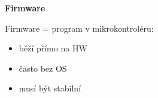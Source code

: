 \documentclass[a4paper,10pt]{article}
\begin{document}
\begin{vysvetlenibox}
\textbf{Firmware}

Firmware = program v mikrokontroléru:
\begin{itemize}
\item běží přímo na HW
\item často bez OS
\item musí být stabilní
\end{itemize}

\end{vysvetlenibox}
\end{document}
